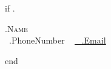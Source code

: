{{if .}}
\begin{center}
    {\Huge \scshape {{.Name}} } \\ \vspace{4pt}
    \small \raisebox{-0.1\height}\faPhone\ {{.PhoneNumber}} ~ \href{ {{.Email}} }{\raisebox{-0.2\height}\faEnvelope\ \underline{ {{.Email}} }}
    \vspace{-8pt}
\end{center}
{{end}}